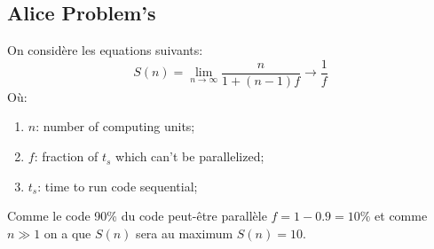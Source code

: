 \documentclass{article}
\begin{document}
\subsection{Alice Problem's}
\begin{resolution}
    On considère les equations suivants:
    \begin{equation}
        \boxed{
            S(n) = \lim_{n\to\infty}\frac{n}{1 + (n-1)f} \to \frac{1}{f}
        }
    \end{equation}
    Où:
    \begin{enumerate}[noitemsep]
        \item $n$: number of computing units;
        \item $f$: fraction of $t_s$ which can't be parallelized;
        \item $t_s$: time to run code sequential;
    \end{enumerate}
    Comme le code 90\% du code peut-être parallèle $f = 1 - 0.9 = 10\%$ et comme $n \gg 1$ on a que $S(n)$ sera au maximum $S(n) = 10$.
\end{resolution}
\end{document}
